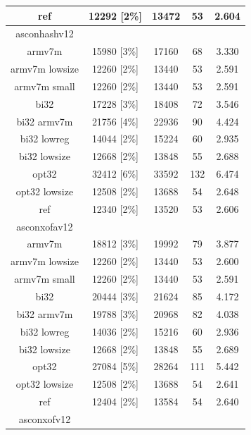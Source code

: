 \documentclass[12pt,a4paper,italian]{report}
\begin{document}
\begin{table}[h]
\begin{tabular}{|c|c|c|c|c|}
        \hline
        ref & 12292 [2\%] & 13472 & 53 & 2.604 \\
        \hline
        asconhashv12 & & & & \\
        \hline
        armv7m & 15980 [3\%] & 17160 & 68 & 3.330 \\
        \hline
        armv7m lowsize & 12260 [2\%] & 13440 & 53 & 2.591 \\
        \hline
        armv7m small & 12260 [2\%] & 13440 & 53 & 2.591 \\
        \hline
        bi32 & 17228 [3\%] & 18408 & 72 & 3.546 \\
        \hline
        bi32 armv7m & 21756 [4\%] & 22936 & 90 & 4.424 \\
        \hline
        bi32 lowreg & 14044 [2\%] & 15224 & 60 & 2.935 \\
        \hline
        bi32 lowsize & 12668 [2\%] & 13848 & 55 & 2.688 \\
        \hline
        opt32 & 32412 [6\%] & 33592 & 132 & 6.474 \\
        \hline
        opt32 lowsize & 12508 [2\%] & 13688 & 54 & 2.648 \\
        \hline
        ref & 12340 [2\%] & 13520 & 53 & 2.606 \\
        \hline
        asconxofav12 & & & & \\
        \hline
        armv7m & 18812 [3\%] & 19992 & 79 & 3.877 \\
        \hline
        armv7m lowsize & 12260 [2\%] & 13440 & 53 & 2.600 \\
        \hline
        armv7m small & 12260 [2\%] & 13440 & 53 & 2.591 \\
        \hline
        bi32 & 20444 [3\%] & 21624 & 85 & 4.172 \\
        \hline
        bi32 armv7m & 19788 [3\%] & 20968 & 82 & 4.038 \\
        \hline
        bi32 lowreg & 14036 [2\%] & 15216 & 60 & 2.936 \\
        \hline
        bi32 lowsize & 12668 [2\%] & 13848 & 55 & 2.689 \\
        \hline
        opt32 & 27084 [5\%] & 28264 & 111 & 5.442 \\
        \hline
        opt32 lowsize & 12508 [2\%] & 13688 & 54 & 2.641 \\
        \hline
        ref & 12404 [2\%] & 13584 & 54 & 2.640 \\
        \hline
        asconxofv12 & & & & \\
        \hline

\end{tabular}
\end{table}
\end{document}
